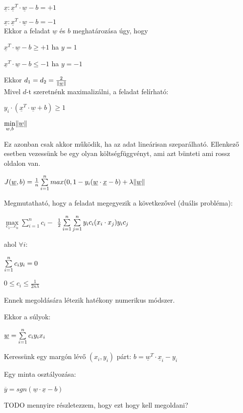 $ \underline{x}: \underline{x}^T \cdot \underline{w} - b = +1 $

$ \underline{x}: \underline{x}^T \cdot \underline{w} - b = -1 $
\\
Ekkor a feladat $ \underline{w} $ és $ b $ meghatározása úgy, hogy 

$ \underline{x}^T \cdot \underline{w} - b \geq +1 $ ha $  y=1 $

$ \underline{x}^T \cdot \underline{w} - b \leq -1 $ ha $  y=-1 $

Ekkor $ d_1 = d_2 = \frac{2}{\lVert\underline{w}\rVert} $  
\\
Mivel $ d $-t szeretnénk maximalizálni, a feladat felírható:

$ y_i \cdot (\underline{x}^T \cdot \underline{w} + b) \geq 1 $

$ \min\limits_{w, b} \lVert\underline{w}\rVert $

Ez azonban csak akkor működik, ha az adat lineárisan szeparálható. Ellenkező esetben
vezessünk be egy olyan költségfüggvényt, ami azt bünteti ami rossz oldalon van.

$ J(\underline{w},b)  = \frac{1}{n} \sum\limits_{i=1}^{n} 
max(0, 1 - y_i(\underline{w} \cdot \underline{x} - b) + \lambda \lVert\underline{w}\rVert $



\noindent
Megmutatható, hogy a feladat megegyezik a következővel (duális probléma): 

$ \max\limits_{c_1 \dots c_n} \sum\limits_{i=1}^{n}c_i -  $
$ \frac{1}{2}\sum\limits_{{i}=1}^{n}\sum\limits_{{j}=1}^{n} y_i c_i (x_i \cdot x_j) y_i c_j $

\noindent
ahol $ \forall i: $

$  \sum\limits_{{i}=1}^{n} c_i y_i = 0 $

$ 0 \leq c_i \leq \frac{1}{2n\lambda} $

\noindent
Ennek megoldására létezik hatékony numerikus módszer.

\noindent
Ekkor a súlyok:

$ \underline{w} = \sum\limits_{{i}=1}^{n} c_i y_i x_i $

\noindent
Keressünk egy margón lévő $ (x_i, y_i) $ párt:
$ b = \underline{w}^T \cdot \underline{x}_i  - y_i$

\noindent
Egy minta osztályozása:

$ \overline{y} = sgn(\underline{w} \cdot \underline{x} - b) $

\noindent
TODO mennyire részletezzem, hogy ezt hogy kell megoldani?





